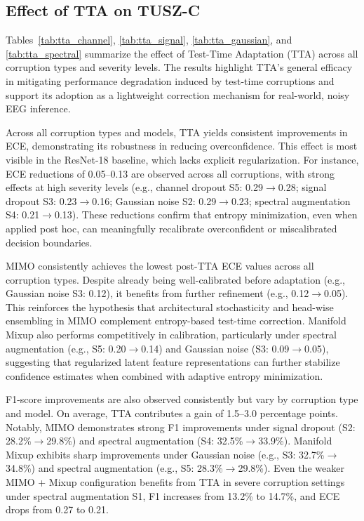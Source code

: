 \subsection*{Effect of TTA on TUSZ-C}
Tables~\ref{tab:tta_channel}, \ref{tab:tta_signal}, \ref{tab:tta_gaussian}, and \ref{tab:tta_spectral} summarize the effect of Test-Time Adaptation (TTA) across all corruption types and severity levels. The results highlight TTA’s general efficacy in mitigating performance degradation induced by test-time corruptions and support its adoption as a lightweight correction mechanism for real-world, noisy EEG inference.

Across all corruption types and models, TTA yields consistent improvements in ECE, demonstrating its robustness in reducing overconfidence. This effect is most visible in the ResNet-18 baseline, which lacks explicit regularization. For instance, ECE reductions of 0.05–0.13 are observed across all corruptions, with strong effects at high severity levels (e.g., channel dropout S5: 0.29$\rightarrow$0.28; signal dropout S3: 0.23$\rightarrow$0.16; Gaussian noise S2: 0.29$\rightarrow$0.23; spectral augmentation S4: 0.21$\rightarrow$0.13). These reductions confirm that entropy minimization, even when applied post hoc, can meaningfully recalibrate overconfident or miscalibrated decision boundaries.

MIMO consistently achieves the lowest post-TTA ECE values across all corruption types. Despite already being well-calibrated before adaptation (e.g., Gaussian noise S3: 0.12), it benefits from further refinement (e.g., 0.12$\rightarrow$0.05). This reinforces the hypothesis that architectural stochasticity and head-wise ensembling in MIMO complement entropy-based test-time correction. Manifold Mixup also performs competitively in calibration, particularly under spectral augmentation (e.g., S5: 0.20$\rightarrow$0.14) and Gaussian noise (S3: 0.09$\rightarrow$0.05), suggesting that regularized latent feature representations can further stabilize confidence estimates when combined with adaptive entropy minimization.

F1-score improvements are also observed consistently but vary by corruption type and model. On average, TTA contributes a gain of 1.5–3.0 percentage points. Notably, MIMO demonstrates strong F1 improvements under signal dropout (S2: 28.2\%$\rightarrow$29.8\%) and spectral augmentation (S4: 32.5\%$\rightarrow$33.9\%). Manifold Mixup exhibits sharp improvements under Gaussian noise (e.g., S3: 32.7\%$\rightarrow$34.8\%) and spectral augmentation (e.g., S5: 28.3\%$\rightarrow$29.8\%). Even the weaker MIMO + Mixup configuration benefits from TTA in severe corruption settings under spectral augmentation S1, F1 increases from 13.2\% to 14.7\%, and ECE drops from 0.27 to 0.21.

